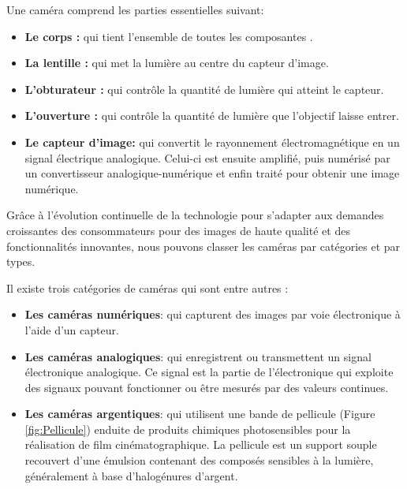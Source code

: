  Une caméra comprend les parties essentielles suivant: 
 \begin{itemize}
 	\item \textbf{Le corps :} qui tient l'ensemble de toutes les composantes . 
 	
 	\item \textbf{La lentille :} qui met la lumière au centre du capteur d’image. 
 	
 	\item \textbf{L’obturateur :} qui contrôle la quantité de lumière qui atteint le capteur.
 	
 	\item \textbf{L’ouverture :} qui contrôle la quantité de lumière que l’objectif laisse entrer.
 	
 	\item \textbf{Le capteur d'image:} qui convertit le rayonnement électromagnétique en un signal électrique analogique. Celui-ci est ensuite amplifié, puis numérisé par un convertisseur analogique-numérique et enfin traité pour obtenir une image numérique.  
 \end{itemize}
 
 Grâce à l'évolution continuelle de la technologie pour s'adapter aux demandes croissantes des consommateurs pour des images de haute qualité et des fonctionnalités innovantes, nous pouvons classer les caméras par catégories et par types.
 
 Il existe trois catégories de caméras qui sont entre autres \cite{noauthor_camera_2024}:
 \begin{itemize}
 	\item \textbf{Les caméras numériques}: qui capturent des images par voie électronique à l’aide d’un capteur.
 	
 	\item \textbf{Les caméras analogiques}: qui enregistrent ou transmettent un signal électronique analogique. 
 	Ce signal est la partie de l'électronique qui exploite des signaux pouvant fonctionner ou être mesurés par des valeurs continues. 
 	
 	\item\textbf{Les caméras argentiques}: qui utilisent une bande de pellicule (Figure \ref{fig:Pellicule}) enduite de produits chimiques photosensibles pour la réalisation de film cinématographique.
 	La pellicule est un support souple recouvert d'une émulsion contenant des composés sensibles à la lumière, généralement à base d'halogénures d'argent.
 	
 \end{itemize}
 
